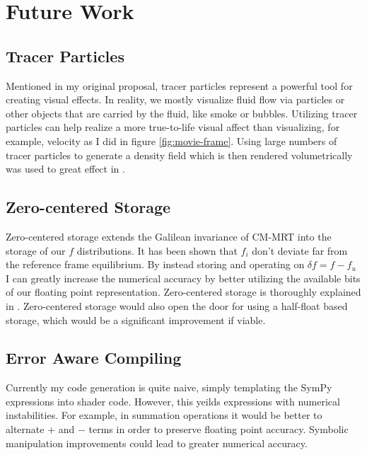 \section{Future Work}\label{sec:futurework}
\subsection{Tracer Particles}
Mentioned in my original proposal, tracer particles
represent a powerful tool for creating visual effects.
In reality, we mostly visualize fluid flow via particles or
other objects that are carried by the fluid, like smoke or bubbles.
Utilizing tracer particles can help realize a more true-to-life
visual affect than visualizing, for example, velocity as I did in
figure \ref{fig:movie-frame}.
Using large numbers of tracer particles to generate a 
density field which is then rendered volumetrically was used to 
great effect in \cite{Li2020, Li2024, Lyu2021}.

\subsection{Zero-centered Storage}
Zero-centered storage extends the Galilean invariance of CM-MRT 
into the storage of our $f$ distributions.
It has been shown that $f_i$ don't deviate far from the reference
frame equilibrium.
By instead storing and operating on $\delta f = f - f_u$ 
I can greatly increase the numerical accuracy by better
utilizing the available bits of our floating point representation.
Zero-centered storage is thoroughly explained in \cite{Hennig2023}.
Zero-centered storage would also open the door for using a half-float 
based storage, which would be a significant improvement if viable.

\subsection{Error Aware Compiling}
Currently my code generation is quite naive, simply
templating the SymPy expressions into shader code.
However, this yeilds expressions with numerical instabilities.
For example, in summation operations it would be better to alternate
$+$ and $-$ terms in order to preserve floating point accuracy.
Symbolic manipulation improvements could lead to greater numerical 
accuracy.

